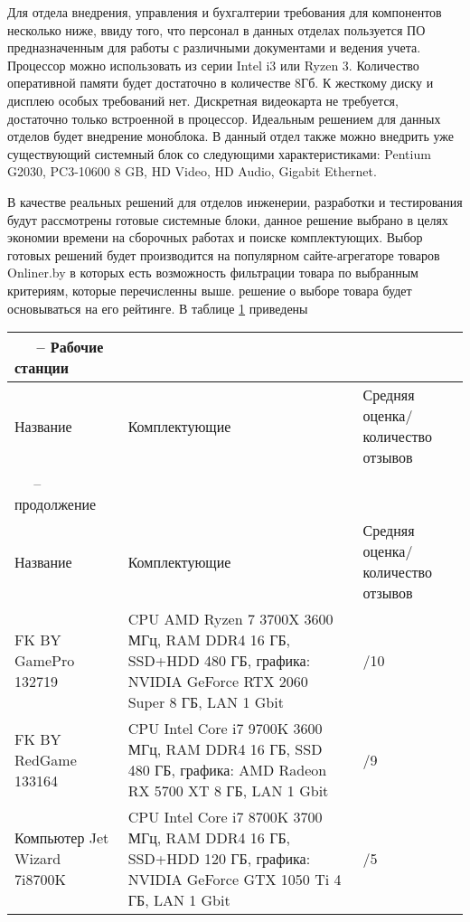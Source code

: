 Для отдела внедрения, управления и бухгалтерии требования для компонентов несколько ниже, ввиду того, что персонал в данных отделах пользуется ПО предназначенным для 
работы с различными документами и ведения учета. Процессор можно использовать из серии Intel i3 или Ryzen 3. Количество оперативной 
памяти будет достаточно в количестве 8Гб. К жесткому диску и дисплею особых требований нет. Дискретная видеокарта не требуется, достаточно только встроенной в процессор.
Идеальным решением для данных отделов будет внедрение моноблока.
В данный отдел также можно внедрить уже существующий системный блок со следующими характеристиками: 
Pentium G2030, PC3-10600 8 GB, HD Video, HD Audio, Gigabit Ethernet. 

В качестве реальных решений для отделов инженерии, разработки и тестирования будут рассмотрены готовые системные блоки, данное решение выбрано в целях экономии времени на 
сборочных работах и поиске комплектующих.
Выбор готовых решений будет производится на популярном сайте-агрегаторе товаров Onliner.by в которых есть возможность фильтрации товара по выбранным критериям,
которые перечисленны выше.
решение о выборе товара будет основываться на его рейтинге. В таблице \ref{table:func:workStations}
приведены 

\begin{longtable}{
    | >{\raggedright}m{}
    | >{\raggedright\arraybackslash}m{}
    | >{\raggedright\arraybackslash}m{}|}
    
    \multicolumn{3}{l}
    {{\tablename\ \thetable{} ~-- Рабочие станции}}
    \label{table:func:workStations} \\
    \hline
    \centering Название
    & \centering\arraybackslash Комплектующие
    & \centering\arraybackslash Средняя оценка/количество отзывов \\
    \hline
    \endfirsthead

    \multicolumn{3}{l}
    {{\tablename\ \thetable{} ~-- продолжение}} \\
    \hline
    \centering Название
    & \centering\arraybackslash Комплектующие
    & \centering\arraybackslash Средняя оценка/количество отзывов \\
    \hline
    \endhead

    \hline
    FK BY GamePro 132719 &
    CPU AMD Ryzen 7 3700X 3600 МГц, RAM DDR4 16 ГБ, SSD+HDD 480 ГБ, графика: NVIDIA GeForce RTX 2060 Super 8 ГБ, LAN 1 Gbit &
    4/10
    \\
    \hline
    FK BY RedGame 133164 &
    CPU Intel Core i7 9700K 3600 МГц, RAM DDR4 16 ГБ, SSD 480 ГБ, графика: AMD Radeon RX 5700 XT 8 ГБ, LAN 1 Gbit &
    5/9
    \\
    \hline
    Компьютер Jet Wizard 7i8700K &
    CPU Intel Core i7 8700K 3700 МГц, RAM DDR4 16 ГБ, SSD+HDD 120 ГБ, графика: NVIDIA GeForce GTX 1050 Ti 4 ГБ, LAN 1 Gbit &
    5/5
    \\
    
    \hline

\end{longtable}  

